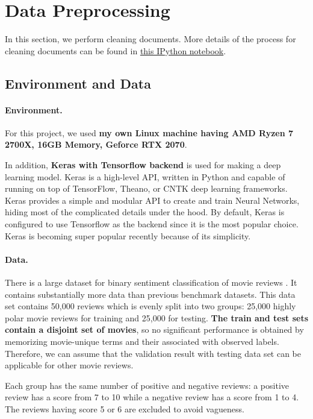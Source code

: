 \documentclass[11pt]{article}
\begin{document}
\section{Data Preprocessing}
\label{Data Preprocessing}

In this section, we perform cleaning documents.
More details of the process for cleaning documents can be found in
\href{https://github.com/ahrimhan/data-science-project/blob/master/project2/cleaning_document.ipynb}{this IPython notebook}. 

\subsection{Environment and Data}

\paragraph*{Environment.}
For this project, we used \textbf{my own Linux machine having AMD Ryzen 7 2700X, 16GB Memory, Geforce RTX 2070}.

In addition, \textbf{Keras with Tensorflow backend} is used for making a deep learning model.
%
Keras is a high-level API, written in Python and capable of running on top of TensorFlow, Theano, or CNTK deep learning frameworks. Keras provides a simple and modular API to create and train Neural Networks, hiding most of the complicated details under the hood. By default, Keras is configured to use Tensorflow as the backend since it is the most popular choice. Keras is becoming super popular recently because of its simplicity.


\paragraph*{Data.}
There is a large dataset for binary sentiment classification of movie reviews \cite{Stanford_movie_review_paper} \cite{Stanford_movie_review_dataset}. It contains substantially more data than previous benchmark datasets. 
This data set contains 50,000 reviews which is evenly split into two groups:
25,000 highly polar movie reviews for training and 25,000 for testing. 
\textbf{The train and test sets contain a disjoint set of movies}, so no significant performance is obtained by memorizing movie-unique terms and their associated with observed labels.  
Therefore, we can assume that the validation result with testing data set can be applicable for other movie reviews.

Each group has the same number of positive and negative reviews: a positive review has a score from 7 to 10 while a negative review has a score from 1 to 4. The reviews having score 5 or 6 are excluded to avoid vagueness.
\end{document}
